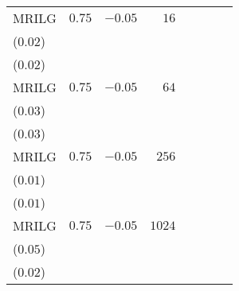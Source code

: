\begin{table}[t]
\begin{tabular}{lrrrrrrr}
MRILG & \(0.75\) & \(-0.05\) & \(16\) & \longcell{\(0.02\)\\{\tiny(\(0.02\))}} & \longcell{\(0.01\)\\{\tiny(\(0.02\))}} \\[2.2ex]
MRILG & \(0.75\) & \(-0.05\) & \(64\) & \longcell{\(0.04\)\\{\tiny(\(0.03\))}} & \longcell{\(0.02\)\\{\tiny(\(0.03\))}} \\[2.2ex]
MRILG & \(0.75\) & \(-0.05\) & \(256\) & \longcell{\(0.10\)\\{\tiny(\(0.01\))}} & \longcell{\(0.03\)\\{\tiny(\(0.01\))}} \\[2.2ex]
MRILG & \(0.75\) & \(-0.05\) & \(1024\) & \longcell{\(0.07\)\\{\tiny(\(0.05\))}} & \longcell{\(0.02\)\\{\tiny(\(0.02\))}} \\
\bottomrule
\end{tabular}
\end{table}
